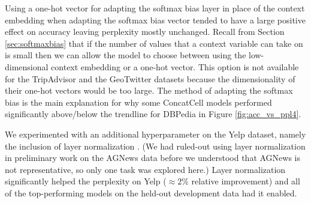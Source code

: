 Using a one-hot vector for adapting the softmax bias layer in place of the context embedding when adapting the softmax bias vector tended to have a large positive effect on accuracy leaving perplexity mostly unchanged. Recall from Section \ref{sec:softmaxbias} that if the number of values that a context variable can take on is small then we can allow the model to choose between using the low-dimensional context embedding or a one-hot vector. This option is not available for the TripAdvisor and the GeoTwitter datasets because the dimensionality of their one-hot vectors would be too large. The method of adapting the softmax bias is the main explanation for why some ConcatCell models performed significantly above/below the trendline for DBPedia in Figure \mbox{\ref{fig:acc_vs_ppl4}}.

We experimented with an additional hyperparameter on the Yelp dataset, namely the inclusion of layer normalization \cite{ba2016layer}. (We had ruled-out using layer normalization in preliminary work on the AGNews data before we understood that AGNews is not representative, so only one task was explored here.) Layer normalization significantly helped the perplexity on Yelp ($\approx 2\%$ relative improvement) and all of the top-performing models on the held-out development data had it enabled.
